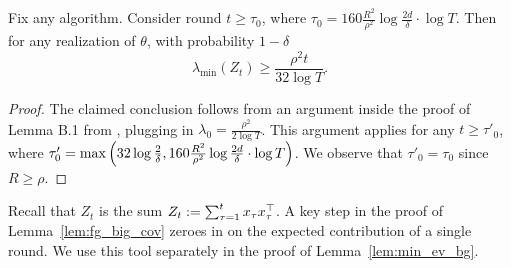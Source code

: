 \begin{lemma}
Fix any \GreedyStyle algorithm. Consider round $t \geq \tau_0$, where
    $\tau_0 =160 \frac{R^2}{\rho^2} \log \frac{2d}{\delta} \cdot \log T$.
Then for any realization of $\theta$, with probability $1-\delta$
  \[
    \lambda_{\min}(Z_t) \ge \frac{\rho^2 t}{32 \log T}.
  \]
  \label{lem:fg_big_cov}
\end{lemma}
\begin{proof}
  The claimed conclusion follows from an argument inside the proof  of
    Lemma B.1 from \citet{kannan2018smoothed},
  plugging in
  $  \lambda_0 = \frac{\rho^2}{2\log T}$.
  This argument applies for any $t\geq \tau'_0$, where
    $\tau'_0 = \max\left(32 \log \frac{2}{\delta}, 160 \frac{R^2}{\rho^2}
  \log \frac{2d}{\delta} \cdot \log T\right)$.
We observe that $\tau'_0=\tau_0$ since $R \ge \rho$.
\end{proof}

Recall that $Z_t$ is the sum
    $Z_t :=\sum_{\tau=1}^t x_\tau x_\tau^{\top}$.
A key step in the proof of Lemma~\ref{lem:fg_big_cov} zeroes in on the expected contribution of a single round. We use this tool separately in the proof of Lemma~\ref{lem:min_ev_bg}.


